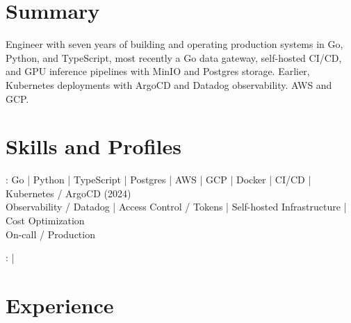 \documentclass[print]{jack-resume}
\begin{document}
\pagecolor{darkmodeBackground}


\begin{minipage}[t][1cm][t]{.03\textwidth}
    \hfill
\end{minipage}

\section{Summary}
Engineer with seven years of building and operating production systems in Go, Python, and TypeScript, most recently a Go data gateway, self-hosted CI/CD, and GPU inference pipelines with MinIO and Postgres storage. Earlier, Kubernetes deployments with ArgoCD and Datadog observability. AWS and GCP.
\sectionsep

\section{Skills and Profiles}
:
Go \hfill | \hfill
Python \hfill | \hfill
TypeScript \hfill | \hfill
Postgres \hfill | \hfill
AWS \hfill | \hfill
GCP \hfill | \hfill
Docker \hfill | \hfill
CI/CD \hfill | \hfill
Kubernetes / ArgoCD (2024) \\
\hspace{1.0cm} Observability / Datadog \hfill | \hfill
Access Control / Tokens \hfill | \hfill
Self-hosted Infrastructure \hfill | \hfill
Cost Optimization \\
\hspace{1.0cm} On-call / Production \\

\raggedright{
    :
      \href{https://www.linkedin.com/in/jack-sturtevant/}{ \ExternalLink} |
     \href{https://github.com/jacksturt}{ \ExternalLink}}

\section{Experience}
\end{document}
